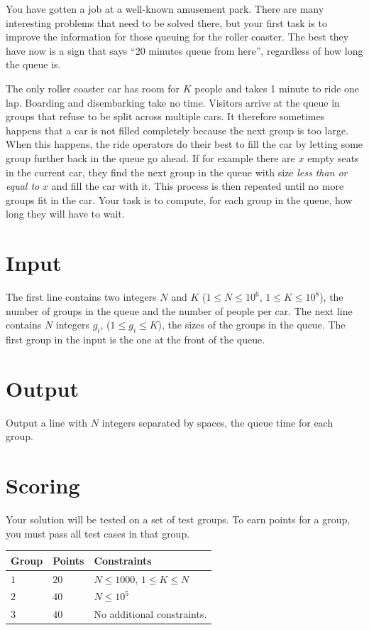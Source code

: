 You have gotten a job at a well-known amusement park. There are many interesting problems that need to be solved there, but your first task is to improve the information for those queuing for the roller coaster. The best they have now is a sign that says ``20 minutes queue from here'', regardless of how long the queue is.

The only roller coaster car has room for $K$ people and takes 1 minute to ride one lap. Boarding and disembarking take no time. Visitors arrive at the queue in groups that refuse to be split across multiple cars. It therefore sometimes happens that a car is not filled completely because the next group is too large. When this happens, the ride operators do their best to fill the car by letting some group further back in the queue go ahead. If for example there are $x$ empty seats in the current car, they find the next group in the queue with size \emph{less than or equal to} $x$ and fill the car with it. This process is then repeated until no more groups fit in the car. Your task is to compute, for each group in the queue, how long they will have to wait.

\section*{Input}
The first line contains two integers $N$ and $K$ ($1 \leq N \leq 10^6$, $1 \leq K \leq 10^8$), the number of
groups in the queue and the number of people per car. The next line contains $N$ integers $g_i$, ($1 \leq g_i \leq K$),
the sizes of the groups in the queue. The first group in the input is the one at the front of the queue.

\section*{Output}
Output a line with $N$ integers separated by spaces, the queue time for each group.

\section*{Scoring}
Your solution will be tested on a set of test groups.
To earn points for a group, you must pass all test cases in that group.


\noindent
\begin{tabular}{| l | l | p{12cm} |}
  \hline
  \textbf{Group} & \textbf{Points} & \textbf{Constraints} \\ \hline
  $1$    & $20$       & $N \leq 1000$, $1 \leq K \leq N$ \\ \hline
  $2$    & $40$       & $N \leq 10^5$ \\ \hline
  $3$    & $40$       & No additional constraints. \\ \hline
\end{tabular}


